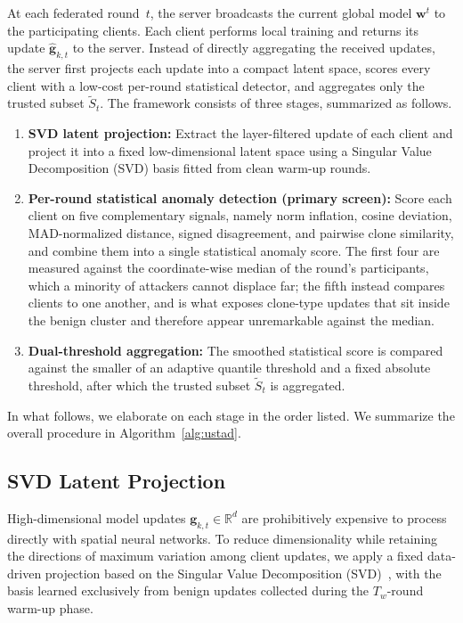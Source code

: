 \documentclass[journal]{IEEEtran}
\begin{document}
At each federated round~$t$, the server broadcasts the current global model $\mathbf{w}^t$ to the participating clients. Each client performs local training and returns its update $\hat{\mathbf{g}}_{k,t}$ to the server. Instead of directly aggregating the received updates, the server first projects each update into a compact latent space, scores every client with a low-cost per-round statistical detector, and aggregates only the trusted subset $\widetilde{S}_t$. The framework consists of three stages, summarized as follows.
\begin{enumerate}
    \item \textbf{SVD latent projection:} Extract the layer-filtered update of each client and project it into a fixed low-dimensional latent space using a Singular Value Decomposition (SVD) basis fitted from clean warm-up rounds.
    \item \textbf{Per-round statistical anomaly detection (primary screen):} Score each client on five complementary signals, namely norm inflation, cosine deviation, MAD-normalized distance, signed disagreement, and pairwise clone similarity, and combine them into a single statistical anomaly score. The first four are measured against the coordinate-wise median of the round's participants, which a minority of attackers cannot displace far; the fifth instead compares clients to one another, and is what exposes clone-type updates that sit inside the benign cluster and therefore appear unremarkable against the median.
    \item \textbf{Dual-threshold aggregation:} The smoothed statistical score is compared against the smaller of an adaptive quantile threshold and a fixed absolute threshold, after which the trusted subset $\widetilde{S}_t$ is aggregated.
\end{enumerate}

In what follows, we elaborate on each stage in the order listed. We summarize the overall procedure in Algorithm~\ref{alg:ustad}.

\subsection{SVD Latent Projection}
\label{sec:svd_projection}

High-dimensional model updates $\mathbf{g}_{k,t} \in \mathbb{R}^d$ are prohibitively expensive to process directly with spatial neural networks. To reduce dimensionality while retaining the directions of maximum variation among client updates, we apply a fixed data-driven projection based on the Singular Value Decomposition (SVD)~\cite{zhang2015singular}, with the basis learned exclusively from benign updates collected during the $T_w$-round warm-up phase.
\end{document}
